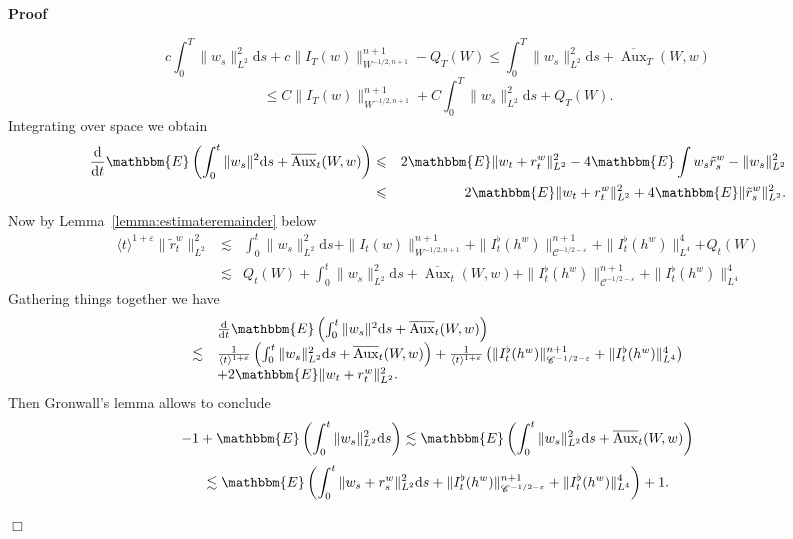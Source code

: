 \documentclass[11pt]{article}
\newcommand{\mathd}{\mathrm{d}}
\newcommand{\tmop}[1]{\ensuremath{\operatorname{#1}}}
\newenvironment{proof}{\noindent\textbf{Proof\ }}{\hspace*{\fill}$\Box$\medskip}
\newcommand{\VV}{\mathscr{C}}
\begin{document}
\begin{proof}
  
  \[ c \int^T_0 \| w_s \|_{L^2}^2 \mathd s + c \| I_T (w) \|^{n + 1}_{W^{- 1 /
     2, n + 1}} - Q_T (W) \leqslant \int^T_0 \| w_s \|_{L^2}^2 \mathd s +
     \overline{\tmop{Aux}}_T (W, w) \]
  \[ \leqslant C \| I_T (w) \|^{n + 1}_{W^{- 1 / 2, n + 1}} + C \int^T_0 \|
     w_s \|_{L^2}^2 \mathd s + Q_T (W) . \]
  Integrating over space we obtain
  \begin{eqnarray*}
    \frac{\mathd}{\mathd t} \mathbbm{E} \left( \int^t_0 \| w_s \|^2 \mathd s +
    \overline{\tmop{Aux}}_t (W, w) \right) & \leqslant & 2\mathbbm{E} \| w_t +
    r_t^w \|_{L^2}^2 - 4\mathbbm{E} \int w_s \tilde{r}_s^w - \| w_s
    \|_{L^2}^2\\
    & \leqslant & 2\mathbbm{E} \| w_t + r_t^w \|_{L^2}^2 + 4\mathbbm{E} \|
    \tilde{r}_s^w \|_{L^2}^2 .
  \end{eqnarray*}
  Now by Lemma~\ref{lemma:estimateremainder} below
  \[ \begin{array}{lll}
       \langle t \rangle^{1 + \varepsilon} \| \tilde{r}_t^w \|_{L^2}^2 &
       \lesssim & \int^t_0 \| w_s \|_{L^2}^2 \mathd s + \| I_t (w) \|^{n +
       1}_{W^{- 1 / 2, n + 1}} + \| I_t^{\flat} (h^w) \|^{n + 1}_{\VV^{- 1 / 2
       - \varepsilon}} + \| I^{\flat}_t (h^w) \|^4_{L^4} +_{} Q_t (W)\\
       & \lesssim & Q_t (W) + \int^t_0 \| w_s \|_{L^2}^2 \mathd s +
       \overline{\tmop{Aux}}_t (W, w) + \| I_t^{\flat} (h^w) \|^{n +
       1}_{\VV^{- 1 / 2 - \varepsilon}} + \| I^{\flat}_t (h^w) \|^4_{L^4}
     \end{array} \]
  Gathering things together we have
  \[ \begin{array}{ll}
       & \frac{\mathd}{\mathd t} \mathbbm{E} \left( \int^t_0 \| w_s \|^2
       \mathd s + \overline{\tmop{Aux}}_t (W, w) \right)\\
       \lesssim & \frac{1}{\langle t \rangle^{1 + \varepsilon}} \left(
       \int^t_0 \| w_s \|_{L^2}^2 \mathd s + \overline{\tmop{Aux}}_t (W, w)
       \right) + \frac{1}{\langle t \rangle^{1 + \varepsilon}} \left( \|
       I_t^{\flat} (h^w) \|^{n + 1}_{\VV^{- 1 / 2 - \varepsilon}} + \|
       I^{\flat}_t (h^w) \|^4_{L^4} \right)\\
       & + 2\mathbbm{E} \| w_t + r_t^w \|_{L^2}^2 .
     \end{array} \]
  Then Gronwall's lemma allows to conclude
  \[ - 1 +\mathbbm{E} \left( \int^t_0 \| w_s \|_{L^2}^2 \mathd s \right)
     \lesssim \mathbbm{E} \left( \int^t_0 \| w_s \|_{L^2}^2 \mathd s +
     \overline{\tmop{Aux}}_t (W, w) \right) \]
  \[ \lesssim \mathbbm{E} \left( \int^t_0 \| w_s + r_s^w \|_{L^2}^2 \mathd s +
     \| I_t^{\flat} (h^w) \|^{n + 1}_{\VV^{- 1 / 2 - \varepsilon}} + \|
     I^{\flat}_t (h^w) \|^4_{L^4} \right) + 1. \]
  
\end{proof}
\end{document}

